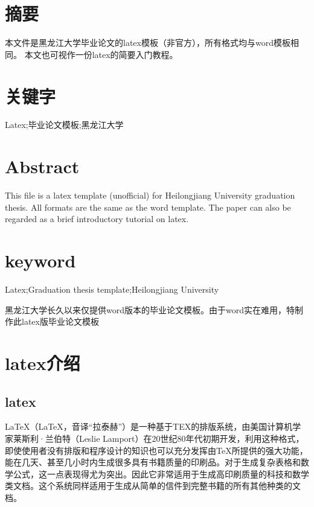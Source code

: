 \documentclass[UTF8]{ctexart}
\renewcommand\thesistitle{论文题目}
\begin{document}
\coverpage



\section*{摘要}
本文件是黑龙江大学毕业论文的latex模板（非官方），所有格式均与word模板相同。
本文也可视作一份latex的简要入门教程。
\newline
\newline
\section*{关键字}
Latex;毕业论文模板;黑龙江大学
\newpage
\section*{\bfseries Abstract}
This file is a latex template (unofficial) for Heilongjiang University graduation thesis.
 All formats are the same as the word template.
 The paper can also be regarded as a brief introductory tutorial on latex.
\newline
\newline
\section*{\bfseries keyword}
Latex;Graduation thesis template;Heilongjiang University
\newpage
\vspace{100pt}
\tableofcontents
\newpage
\fancyhead[C]{\kaishu\fontsize{10.5pt}{0}\ziju{0.005}{\thesistitle}}
\renewcommand{\headrulewidth}{0.5pt}
\setcounter{page}{1}

黑龙江大学长久以来仅提供word版本的毕业论文模板。由于word实在难用，特制作此latex版毕业论文模板

\section{latex介绍}

\subsection{latex}


LaTeX（\LaTeX ，音译“拉泰赫”）是一种基于ΤΕΧ的排版系统，由美国计算机学家莱斯利·兰伯特（Leslie Lamport）在20世纪80年代初期开发，利用这种格式，即使使用者没有排版和程序设计的知识也可以充分发挥由TeX所提供的强大功能，能在几天、甚至几小时内生成很多具有书籍质量的印刷品。对于生成复杂表格和数学公式，这一点表现得尤为突出。因此它非常适用于生成高印刷质量的科技和数学类文档。这个系统同样适用于生成从简单的信件到完整书籍的所有其他种类的文档。
\end{document}
